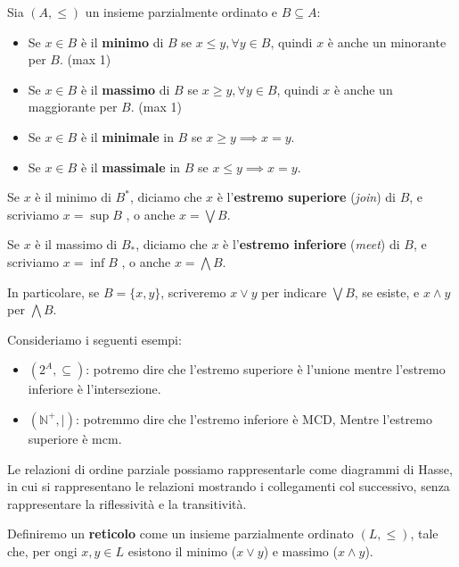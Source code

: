 \begin{definizione}
    Sia $(A,\leq)$ un insieme parzialmente ordinato e $B \subseteq A$:
    \begin{itemize}
        \item Se $x \in B$ è il \textbf{minimo} di $B$ se $x \leq y, \forall y
                  \in B$, quindi $x$ è anche un minorante per $B$. (max 1)
        \item Se $x \in B$ è il \textbf{massimo} di $B$ se $x \geq y,\forall y
                  \in B$, quindi $x$ è anche un maggiorante per $B$. (max 1)
        \item Se $x \in B$ è il \textbf{minimale} in $B$ se $x \geq y \implies
                  x = y$.
        \item Se $x \in B$ è il \textbf{massimale} in $B$ se $x \leq y \implies
                  x = y$.
    \end{itemize}
\end{definizione}
\begin{definizione}
    Se $x$ è il minimo di $B^\ast$, diciamo che $x$ è l'\textbf{estremo superiore}
    (\textit{join}) di $B$, e scriviamo $x = \sup B$ , o anche $x = \bigvee B$.

    Se $x$ è il massimo di $B_\ast$, diciamo che $x$ è l'\textbf{estremo inferiore}
    (\textit{meet}) di $B$, e scriviamo $x = \inf B$ , o anche $x = \bigwedge B$.

    In particolare, se $B = \{x, y\}$, scriveremo $x \lor y$ per indicare $\bigvee
        B$, se esiste, e $x \land y$ per $\bigwedge B$.
\end{definizione}
\begin{esempio}
    Consideriamo i seguenti esempi:
    \begin{itemize}
        \item $(2^A, \subseteq)$: potremo dire che l'estremo superiore è l'unione
              mentre l'estremo inferiore è l'intersezione.
        \item $(\mathbb{N}^+,|)$: potremmo dire che l'estremo inferiore è MCD, Mentre
              l'estremo superiore è mcm.
    \end{itemize}
\end{esempio}
Le relazioni di ordine parziale possiamo rappresentarle come diagrammi di Hasse,
in cui si rappresentano le relazioni mostrando i collegamenti col successivo, senza
rappresentare la riflessività e la transitività.
\begin{definizione}
    Definiremo un \textbf{reticolo} come un insieme parzialmente ordinato $(L,
        \leq)$, tale che, per ongi $x,y\in L$ esistono il minimo ($x \lor y$) e
    massimo ($x \land y$).
\end{definizione}
